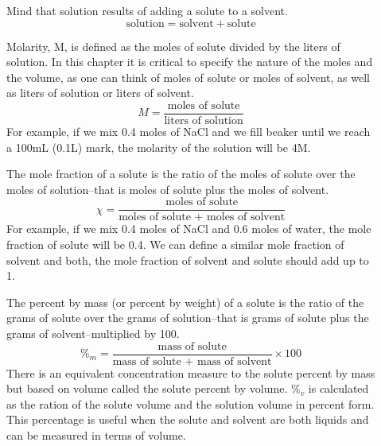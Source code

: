 \documentclass[main.tex]{subfiles}
\newcommand\chapterlabel{physicalsolutions}
\begin{document}
\sloppy 
\begin{description}
\item[] 
Mind that solution results of adding a solute to a solvent.
\begin{equation}
\text{solution}=\text{solvent} + \text{solute}\label{\chapterlabel:equation1}
\end{equation}
\item[] 
Molarity, M, is defined as the moles of solute divided by the liters of solution. In this chapter it is critical to specify the nature of the moles and the volume, as one can think of moles of solute or moles of solvent, as well as liters of solution or liters of solvent.
\begin{equation}
\boxed{ M=\frac{\text{moles of solute}}{\text{liters of solution}}}\label{\chapterlabel:equation2}
\end{equation}
For example, if we mix 0.4 moles of NaCl and we fill beaker until we reach a 100mL (0.1L) mark, the molarity of the solution will be 4M.
\item[] 
The mole fraction of a solute is the ratio of the moles of solute over the moles of solution--that is moles of solute plus the moles of solvent.
\begin{equation}
\boxed{ \chi=\frac{\text{moles of solute}}{\text{moles of solute + moles of solvent}}}\label{\chapterlabel:equation3}
\end{equation}
For example, if we mix 0.4 moles of NaCl and 0.6 moles of water, the mole fraction of solute will be 0.4. We can define a similar mole fraction of solvent and both, the mole fraction of solvent and solute should add up to 1.
\item[] 
The percent by mass (or percent by weight) of a solute is the ratio of the grams of solute over the grams of solution--that is grams of solute plus the grams of solvent--multiplied by 100.
\begin{equation}
\boxed{ \%_m=\frac{\text{mass of solute}}{\text{mass of solute + mass of solvent}}\times 100}\label{\chapterlabel:equation4}\end{equation}
There is an equivalent concentration measure to the solute percent by mass but based on volume called the solute percent by volume. $\%_v$ is calculated as the ration of the solute volume and the solution volume in percent form. This percentage is useful when the solute and solvent are both liquids and can be measured in terms of volume.

\end{description}
\end{document}
